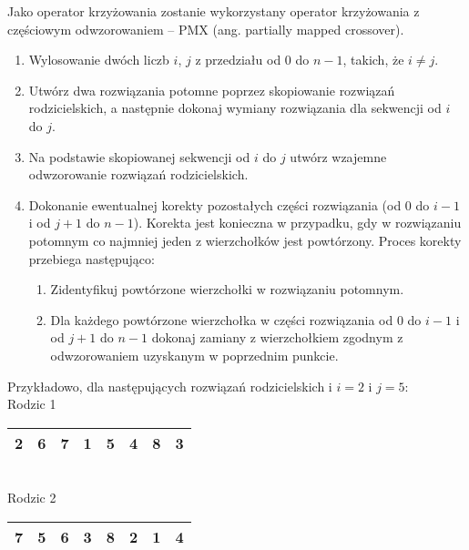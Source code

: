 \documentclass[12pt, a4paper]{article}
\begin{document}
Jako operator krzyżowania zostanie wykorzystany operator krzyżowania z częściowym odwzorowaniem -- {PMX} (ang. partially mapped crossover).
\begin{enumerate}
 \item Wylosowanie dwóch liczb $i$, $j$ z przedziału od $0$ do $n-1$, takich, że $i \neq j$.
 \item Utwórz dwa rozwiązania potomne poprzez skopiowanie rozwiązań rodzicielskich, a następnie dokonaj wymiany rozwiązania dla sekwencji od $i$ do $j$.
 \item Na podstawie skopiowanej sekwencji od $i$ do $j$ utwórz wzajemne odwzorowanie rozwiązań rodzicielskich.
 \item Dokonanie ewentualnej korekty pozostałych części rozwiązania (od $0$ do $i-1$ i od $j+1$ do $n-1$). Korekta jest konieczna w przypadku, gdy w rozwiązaniu potomnym co najmniej jeden z wierzchołków jest powtórzony. Proces korekty przebiega następująco:
 \begin{enumerate}
 	\item Zidentyfikuj powtórzone wierzchołki w rozwiązaniu potomnym.
 	\item Dla każdego powtórzone wierzchołka w części rozwiązania od $0$ do $i-1$ i od $j+1$ do $n-1$ dokonaj zamiany z wierzchołkiem zgodnym z odwzorowaniem uzyskanym w poprzednim punkcie.
 \end{enumerate}
\end{enumerate}

Przykładowo, dla następujących rozwiązań rodzicielskich i $i = 2$ i $j = 5$:\\

Rodzic 1
\begin{tabular}{ | c | c | c | c | c | c | c | c |}
  \hline
  2 & 6 &  \cellcolor{green!25}7 & \cellcolor{green!25}1 & \cellcolor{green!25}5 & \cellcolor{green!25}4 & 8 & 3 \\ \hline
\end{tabular}\\

Rodzic 2
\begin{tabular}{ | c | c | c | c | c | c | c | c |}
  \hline
  7 & 5 & \cellcolor{blue!25}6 & \cellcolor{blue!25}3 & \cellcolor{blue!25}8 & \cellcolor{blue!25}2 & 1 & 4 \\ \hline
\end{tabular}\\
\end{document}
